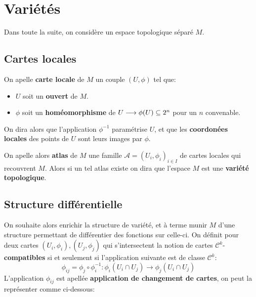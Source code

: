 \chapter{Variétés}
   Dans toute la suite, on considère un espace topologique séparé \( M \).
   \section{Cartes locales}
      On apelle \textbf{carte locale} de \( M \) un couple \( (U, \phi) \) tel que:
      \begin{itemize}
         \item \( U \) soit un \textbf{ouvert} de \( M \).
         \item \( \phi \) soit un \textbf{homéomorphisme} de \( U \longrightarrow \phi(U) \subseteq 2^n \) pour un \( n \) convenable.
      \end{itemize}
      On dira alors que l'application \( \phi^{-1} \) paramétrise \( U \), et que les \textbf{coordonées locales} des points de \( U \) sont leurs images par \( \phi \).\<

      On apelle alors \textbf{atlas} de \( M \) une famille \(\mathcal{A} = (U_i, \phi_i)_{i \in I}\) de cartes locales qui recouvrent \( M \). Alors si un tel atlas existe on dira que l'espace \( M \) est une \textbf{variété topologique}.
   \section{Structure différentielle}
   On souhaite alors enrichir la structure de variété, et à terme munir \( M \) d'une structure permettant de différentier des fonctions sur celle-ci. On définit pour deux cartes \( (U_i, \phi_i), (U_j, \phi_j) \) qui s'intersectent la notion de cartes \( \mathcal{C}^k \)-\textbf{compatibles} si et seulement si l'application suivante est de classe \( \mathcal{C}^k \):
   \[ 
      \phi_{ij} = \phi_j \circ \phi_i^{-1} : \phi_i(U_i \cap U_j) \longrightarrow \phi_j(U_i \cap U_j)
   \]
   L'application \( \phi_{ij} \) est apellée \textbf{application de changement de cartes}, on peut la représenter comme ci-dessous:

